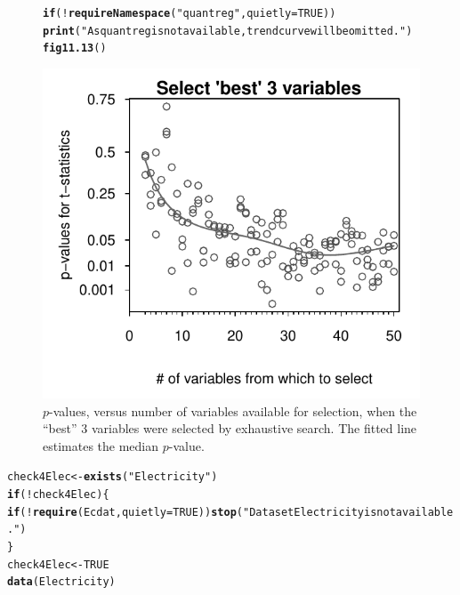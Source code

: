 \documentclass[12pt, a4paper,  BCOR=8.25mm, DIV=15]{scrartcl}\usepackage[]{graphicx}\usepackage[]{color}
\makeatletter
\def\maxwidth{ %
  \ifdim\Gin@nat@width>\linewidth
    \linewidth
  \else
    \Gin@nat@width
  \fi
}
\newcommand{\hlnum}[1]{\textcolor[rgb]{0.686,0.059,0.569}{#1}}%
\newcommand{\hlstr}[1]{\textcolor[rgb]{0.192,0.494,0.8}{#1}}%
\newcommand{\hlopt}[1]{\textcolor[rgb]{0,0,0}{#1}}%
\newcommand{\hlstd}[1]{\textcolor[rgb]{0.345,0.345,0.345}{#1}}%
\newcommand{\hlkwa}[1]{\textcolor[rgb]{0.161,0.373,0.58}{\textbf{#1}}}%
\newcommand{\hlkwb}[1]{\textcolor[rgb]{0.69,0.353,0.396}{#1}}%
\newcommand{\hlkwc}[1]{\textcolor[rgb]{0.333,0.667,0.333}{#1}}%
\newcommand{\hlkwd}[1]{\textcolor[rgb]{0.737,0.353,0.396}{\textbf{#1}}}%
\newenvironment{kframe}{%
 \def\at@end@of@kframe{}%
 \ifinner\ifhmode%
  \def\at@end@of@kframe{\end{minipage}}%
  \begin{minipage}{\columnwidth}%
 \fi\fi%
 \def\FrameCommand##1{\hskip\@totalleftmargin \hskip-\fboxsep
 \colorbox{shadecolor}{##1}\hskip-\fboxsep
     \hskip-\linewidth \hskip-\@totalleftmargin \hskip\columnwidth}%
 \MakeFramed {\advance\hsize-\width
   \@totalleftmargin\z@ \linewidth\hsize
   \@setminipage}}%
 {\par\unskip\endMakeFramed%
 \at@end@of@kframe}
\newenvironment{knitrout}{}{} %
\makeatother
\begin{document}
\begin{figure}[H]
\begin{knitrout}
\color{fgcolor}\begin{kframe}
\begin{alltt}
\hlkwa{if}\hlstd{(}\hlopt{!}\hlkwd{requireNamespace}\hlstd{(}\hlstr{"quantreg"}\hlstd{,} \hlkwc{quietly}\hlstd{=}\hlnum{TRUE}\hlstd{))}
    \hlkwd{print}\hlstd{(}\hlstr{"As quantreg is not available, trend curve will be omitted."}\hlstd{)}
\hlkwd{fig11.13}\hlstd{()}
\end{alltt}
\end{kframe}

{\centering \includegraphics[width=\maxwidth]{figs/reg-bsnVary-11_13-1} 

}



\end{knitrout}
\caption{$p$-values, versus number of variables available for selection,
  when the ``best'' 3 variables were selected by exhaustive search.
  The fitted line estimates the median $p$-value.\label{fig:exhaust}}
\end{figure}

\begin{knitrout}
\color{fgcolor}\begin{kframe}
\begin{alltt}
\hlstd{check4Elec} \hlkwb{<-} \hlkwd{exists}\hlstd{(}\hlstr{"Electricity"}\hlstd{)}
\hlkwa{if}\hlstd{(}\hlopt{!}\hlstd{check4Elec)\{}
    \hlkwa{if}\hlstd{(}\hlopt{!}\hlkwd{require}\hlstd{(Ecdat,} \hlkwc{quietly}\hlstd{=}\hlnum{TRUE}\hlstd{))}\hlkwd{stop}\hlstd{(}\hlstr{"Dataset Electricity is not available."}\hlstd{)}
\hlstd{\}}
\hlstd{check4Elec} \hlkwb{<-} \hlnum{TRUE}
\hlkwd{data}\hlstd{(Electricity)}
\end{alltt}
\end{kframe}
\end{knitrout}
\end{document}
